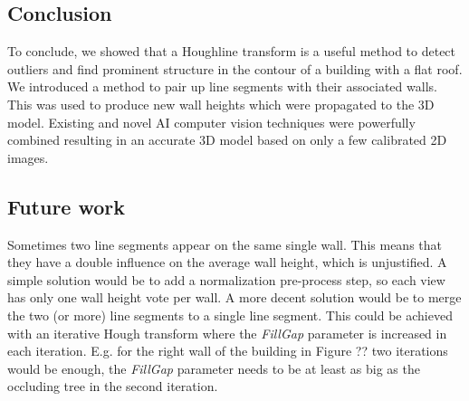 
\subsection{Conclusion}


To conclude, we showed that a Houghline transform is a useful method to detect outliers and find prominent structure in the contour of a building with a flat roof. We introduced a method to pair up line segments with their associated walls. This was used to produce new wall heights which were propagated to the 3D model.
Existing and novel AI computer vision techniques were powerfully combined resulting in an accurate 3D model based on only a few calibrated 2D images. 

\subsection{Future work}
Sometimes two line segments appear on the same single wall. This means that they have a double
influence on the average wall height, which is unjustified. 
A simple solution would be to add a normalization pre-process step, so each view
has only one wall height vote per wall. A more decent solution would be to
merge the two (or more) line segments to a single line segment. This could be
achieved with an iterative Hough transform where the \emph{FillGap} parameter is
increased in each iteration. E.g. for the right wall of the building in Figure
??  %
two iterations would be enough, the \emph{FillGap} parameter needs to be at least as big as the occluding tree in the second iteration.\\

